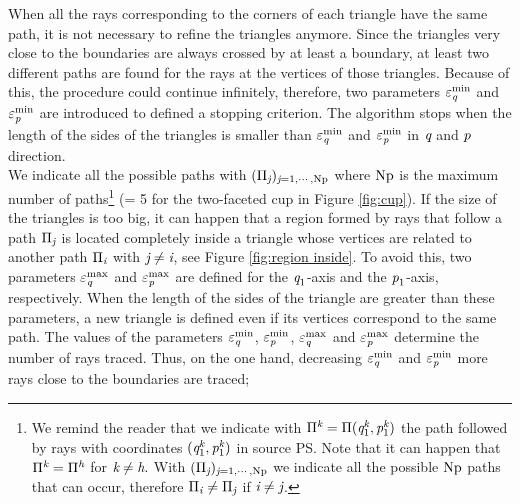 When all the rays corresponding to the corners of each triangle have the same path, it is not necessary to refine the triangles anymore.
Since the triangles very close to the boundaries are always crossed by at least a boundary, at least two different paths are found for the rays at the vertices of those triangles. 
Because of this, the procedure could continue infinitely, therefore, two parameters $\varepsilon_{\textit{q}}^\textrm{min}$ and $\varepsilon_{\textit{p}}^\textrm{min}$ are introduced to defined a stopping criterion.
The algorithm stops when the length of the sides of the triangles is smaller than $\varepsilon_{\textit{q}}^\textrm{min}$ and $\varepsilon_{\textit{p}}^\textrm{min}$ in $\textit{q}$ and $\textit{p}$ direction. \\ \indent 
We indicate all the possible paths with $(\Pi_{\textit{j}})_{\textit{j}=1, \cdots, \textrm{Np}}$ where $\textrm{Np}$ is the maximum number of paths\footnote{We remind the reader that we indicate with $\Pi^{\textit{k}} = \Pi(\textit{q}_1^{\textit{k}},\textit{p}_1^{\textit{k}})$ the path followed by rays with coordinates $(\textit{q}_1^{\textit{k}},\textit{p}_1^{\textit{k}})$ in source PS. Note that it
can happen that $\Pi^{\textit{k}}= \Pi^{\textit{h}}$ for $\textit{k}\neq\textit{h}.$
With $(\Pi_{\textit{j}})_{\textit{j}=1, \cdots, \textrm{Np}}$ we indicate all the possible $\textrm{Np}$ paths that can occur, therefore $\Pi_{\textit{i}}\neq\Pi_{\textit{j}}$ if $\textit{i}\neq\textit{j}$.} (\npath = 5 for the two-faceted cup in Figure \ref{fig:cup}).
If the size of the triangles is too big, it can happen that a region formed by rays that follow a path $\Pi_{\textit{j}}$ is located completely inside a triangle whose vertices are related to another path $\Pi_{\textit{i}}$ with $\textit{j} \neq  \textit{i}$, see Figure \ref{fig:region inside}.
To avoid this, two parameters $\varepsilon_{\textit{q}}^{\textrm{max}}$ and $\varepsilon_{\textit{p}}^{\textrm{max}}$ are defined for the $\textit{q}_1$-axis and the $\textit{p}_1$-axis, respectively.
When the length of the sides of the triangle are greater than these parameters, a new triangle is defined even if its vertices correspond to the same path.
The values of the parameters $\varepsilon_{\textit{q}}^\textrm{min}$, $\varepsilon_{\textit{p}}^\textrm{min}$, $\varepsilon_{\textit{q}}^\textrm{max}$ and $\varepsilon_{\textit{p}}^\textrm{max}$ determine the number of rays traced.
Thus, on the one hand, decreasing $\varepsilon_{\textit{q}}^\textrm{min}$ and $\varepsilon_{\textit{p}}^\textrm{min}$ more rays close to the boundaries are traced;
